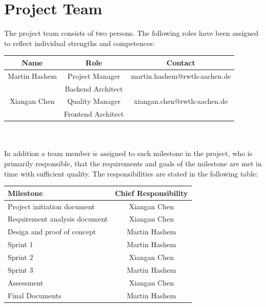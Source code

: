 \documentclass[runningheads]{llncs}
\begin{document}
\section{Project Team}
The project team consists of two persons. The following roles have been assigned to reflect individual strengths and competences:\\


\renewcommand\arraystretch{2}
\begin{tabular}{c|cc}
	Name& Role& Contact\\
	\hline
	Martin Hashem& Project Manager& martin.hashem@rwth-aachen.de\\
	& Backend Architect& \\ 
	Xiangan Chen& Quality Manager& xiangan.chen@rwth-aachen.de\\
	& Frontend Architect & \\
\end{tabular}
\\\\[2pt]
In addition a team member is assigned to each milestone in the project, who is primarily
responsible, that the requirements and goals of the milestone are met in time with sufficient quality. The responsibilities are stated in the following table:\\

\begin{tabular}{lc}
	Milestone& Chief Responsibility\\
	\hline
	Project initiation document& Xiangan Chen\\
	Requirement analysis document& Xiangan Chen\\
	Design and proof of concept& Martin Hashem\\
	Sprint 1& Martin Hashem\\
	Sprint 2& Xiangan Chen\\
	Sprint 3& Martin Hashem\\
	Assessment& Xiangan Chen\\
	Final Documents& Martin Hashem\\
\end{tabular}




\end{document}
